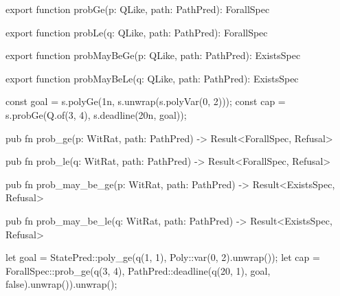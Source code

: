 \begin{tssrc}
export function probGe(p: QLike, path: PathPred): ForallSpec

export function probLe(q: QLike, path: PathPred): ForallSpec

export function probMayBeGe(p: QLike, path: PathPred): ExistsSpec

export function probMayBeLe(q: QLike, path: PathPred): ExistsSpec
\end{tssrc}
\begin{tssrc}
const goal = s.polyGe(1n, s.unwrap(s.polyVar(0, 2)));
const cap = s.probGe(Q.of(3, 4), s.deadline(20n, goal));
\end{tssrc}
\begin{rustsrc}
pub fn prob_ge(p: WitRat, path: PathPred) -> Result<ForallSpec, Refusal>

pub fn prob_le(q: WitRat, path: PathPred) -> Result<ForallSpec, Refusal>

pub fn prob_may_be_ge(p: WitRat, path: PathPred) -> Result<ExistsSpec, Refusal>

pub fn prob_may_be_le(q: WitRat, path: PathPred) -> Result<ExistsSpec, Refusal>
\end{rustsrc}
\begin{rustsrc}
let goal = StatePred::poly_ge(q(1, 1), Poly::var(0, 2).unwrap());
let cap =
    ForallSpec::prob_ge(q(3, 4), PathPred::deadline(q(20, 1), goal, false).unwrap()).unwrap();
\end{rustsrc}
